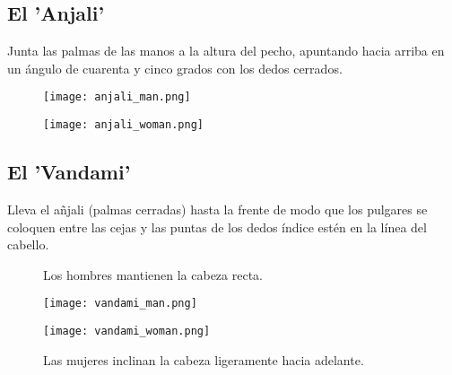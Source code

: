 \subsection{El 'Anjali'}

Junta las palmas de las manos a la altura del pecho, apuntando hacia arriba en un ángulo de cuarenta y cinco grados con los dedos cerrados.
\begin{figure}[h]
	\centering
	
	\begin{minipage}{0.49\textwidth}
		\centering
		\texttt{[image: anjali\_man.png]}
	\end{minipage}
	\hfill
	\begin{minipage}{0.49\textwidth}
		\centering
		\texttt{[image: anjali\_woman.png]}
	\end{minipage}
	
\end{figure}

\subsection{El 'Vandami'}

Lleva el añjali (palmas cerradas) hasta la frente de modo que los pulgares se coloquen entre las cejas y las puntas de los dedos índice estén en la línea del cabello.

\begin{figure}[h]
	\centering
	
	\begin{minipage}{0.49\textwidth}
		\centering
		\caption{Los hombres mantienen la cabeza recta.}
		\texttt{[image: vandami\_man.png]}
	\end{minipage}
	\hfill
	\begin{minipage}{0.49\textwidth}
		\centering
		\caption{Las mujeres inclinan la cabeza ligeramente hacia adelante.}
		\texttt{[image: vandami\_woman.png]}

	\end{minipage}
\end{figure}
\enlargethispage{3\baselineskip}

